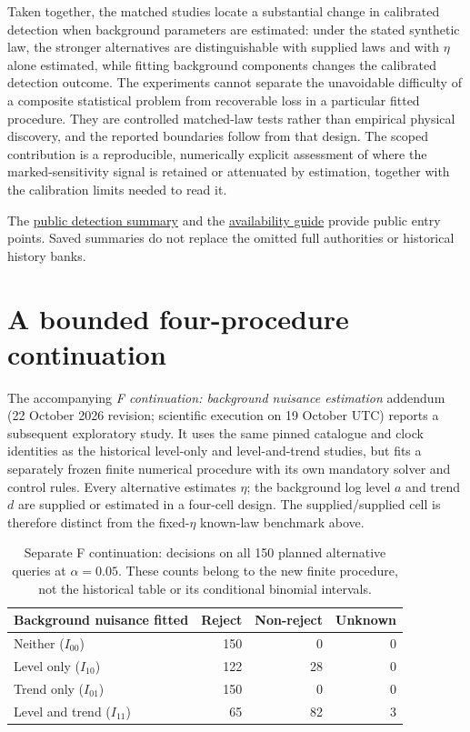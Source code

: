 Taken together, the matched studies locate a substantial change in calibrated detection when background parameters are estimated: under the stated synthetic law, the stronger alternatives are distinguishable with supplied laws and with \(\eta\) alone estimated, while fitting background components changes the calibrated detection outcome. The experiments cannot separate the unavoidable difficulty of a composite statistical problem from recoverable loss in a particular fitted procedure. They are controlled matched-law tests rather than empirical physical discovery, and the reported boundaries follow from that design. The scoped contribution is a reproducible, numerically explicit assessment of where the marked-sensitivity signal is retained or attenuated by estimation, together with the calibration limits needed to read it. 

The \href{https://github.com/Drefetr/InhibitoryEarthquakeModels/blob/3e76a174cf4f58ce601c6c9640c4d0c11168813f/paper/data/detection.json}{public detection summary} and the \hyperref[sec:source-supplements]{availability guide} provide public entry points. Saved summaries do not replace the omitted full authorities or historical history banks.

\section{A bounded four-procedure continuation}
\label{sec:f-continuation}

The accompanying \emph{F continuation: background nuisance estimation}
addendum (22 October 2026 revision; scientific execution on 19 October UTC)
reports a subsequent exploratory study. It uses the same pinned catalogue
and clock identities as the historical level-only and level-and-trend
studies, but fits a separately frozen finite numerical procedure with its
own mandatory solver and control rules. Every alternative estimates
\(\eta\); the background log level \(a\) and trend \(d\) are supplied or
estimated in a four-cell design. The supplied/supplied cell is therefore
distinct from the fixed-\(\eta\) known-law benchmark above.

\begin{table}[H]
\centering
\caption{Separate F continuation: decisions on all 150 planned alternative
queries at \(\alpha=0.05\). These counts belong to the new finite procedure,
not the historical table or its conditional binomial intervals.}
\label{tab:f-continuation}
\small
\begin{tabular}{@{}lrrr@{}}\toprule
Background nuisance fitted & Reject & Non-reject & Unknown\\\midrule
Neither (\(I_{00}\)) & 150 & 0 & 0\\
Level only (\(I_{10}\)) & 122 & 28 & 0\\
Trend only (\(I_{01}\)) & 150 & 0 & 0\\
Level and trend (\(I_{11}\)) & 65 & 82 & 3\\\bottomrule
\end{tabular}
\end{table}

